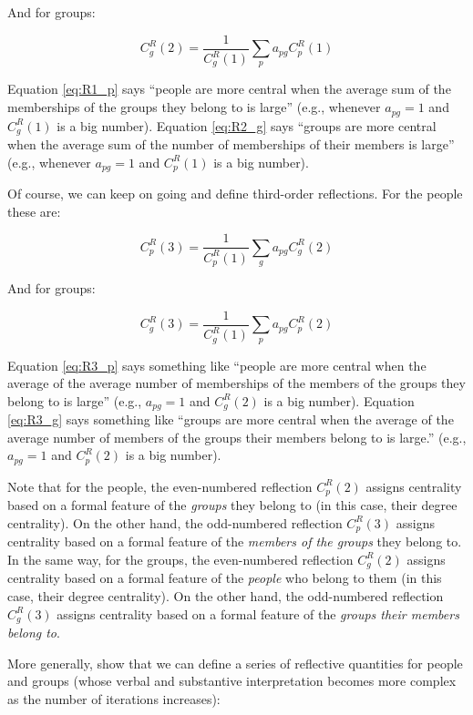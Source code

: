 \documentclass[a4paper,fleqn]{cas-sc}
\begin{document}
And for groups:

\begin{equation}
   C^R_g(2) = \frac{1}{C^R_g(1)}\sum_p a_{pg}C^R_p(1)
    \label{eq:R2_g}
\end{equation}

Equation \ref{eq:R1_p} says ``people are more central when the average sum of the memberships of the groups they belong to is large'' (e.g., whenever $a_{pg} = 1$ and $C^R_g(1)$ is a big number). Equation \ref{eq:R2_g} says ``groups are more central when the average sum of the number of memberships of their members is large'' (e.g., whenever $a_{pg} = 1$ and $C^R_p(1)$ is a big number).

Of course, we can keep on going and define third-order reflections. For the people these are:

\begin{equation}
   C^R_p(3) = \frac{1}{C^R_p(1)}\sum_g a_{pg}C^R_g(2)
   \label{eq:R3_p}
\end{equation}

And for groups:

\begin{equation}
   C^R_g(3) = \frac{1}{C^R_g(1)}\sum_p a_{pg}C^R_p(2)
   \label{eq:R3_g}
\end{equation}

Equation \ref{eq:R3_p} says something like ``people are more central when the average of the average number of memberships of the members of the groups they belong to is large'' (e.g., $a_{pg} = 1$ and $C^R_g(2)$ is a big number). Equation \ref{eq:R3_g} says something like ``groups are more central when the average of the average number of members of the groups their members belong to is large.'' (e.g., $a_{pg} = 1$ and $C^R_p(2)$ is a big number).

Note that for the people, the even-numbered reflection $C^R_p(2)$ assigns centrality based on a formal feature of the \textit{groups} they belong to (in this case, their degree centrality). On the other hand, the odd-numbered reflection $C^R_p(3)$ assigns centrality based on a formal feature of the \textit{members of the groups} they belong to. In the same way, for the groups, the even-numbered reflection $C^R_g(2)$ assigns centrality based on a formal feature of the \textit{people} who belong to them (in this case, their degree centrality). On the other hand, the odd-numbered reflection $C^R_g(3)$ assigns centrality based on a formal feature of the \textit{groups their members belong to}.

More generally, \citet{hidalgo2009building} show that we can define a series of reflective quantities for people and groups (whose verbal and substantive interpretation becomes more complex as the number of iterations increases):
\end{document}
